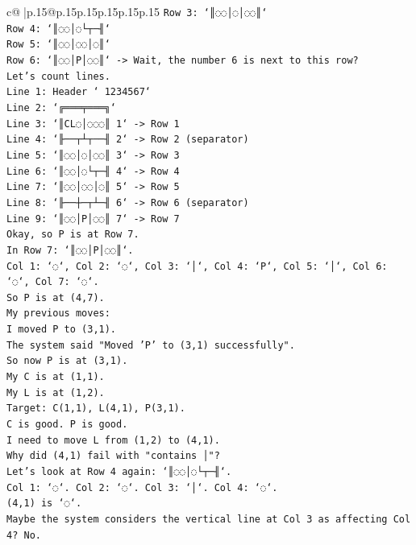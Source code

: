 \documentclass{article}
\begin{document}
{\begin{supertabular}{c@{$\;$}|p{.15\linewidth}@{}p{.15\linewidth}p{.15\linewidth}p{.15\linewidth}p{.15\linewidth}p{.15\linewidth}}
{{{\texttt{Row 3: `║◌◌│◌│◌◌║`} \\
\texttt{Row 4: `║◌◌│◌└┬─╢`} \\
\texttt{Row 5: `║◌◌│◌◌│◌║`} \\
\texttt{Row 6: `║◌◌│P│◌◌║` {-}> Wait, the number 6 is next to this row?} \\
\texttt{Let's count lines.} \\
\texttt{Line 1: Header ` 1234567`} \\
\texttt{Line 2: `╔═══╤═══╗`} \\
\texttt{Line 3: `║CL◌│◌◌◌║ 1` {-}> Row 1} \\
\texttt{Line 4: `╟──┬┴┬──╢ 2` {-}> Row 2 (separator)} \\
\texttt{Line 5: `║◌◌│◌│◌◌║ 3` {-}> Row 3} \\
\texttt{Line 6: `║◌◌│◌└┬─╢ 4` {-}> Row 4} \\
\texttt{Line 7: `║◌◌│◌◌│◌║ 5` {-}> Row 5} \\
\texttt{Line 8: `╟──┼─┬┴─╢ 6` {-}> Row 6 (separator)} \\
\texttt{Line 9: `║◌◌│P│◌◌║ 7` {-}> Row 7} \\
\texttt{Okay, so P is at Row 7.} \\
\texttt{In Row 7: `║◌◌│P│◌◌║`.} \\
\texttt{Col 1: `◌`, Col 2: `◌`, Col 3: `│`, Col 4: `P`, Col 5: `│`, Col 6: `◌`, Col 7: `◌`.} \\
\texttt{So P is at (4,7).} \\
\texttt{My previous moves:} \\
\texttt{I moved P to (3,1).} \\
\texttt{The system said "Moved 'P' to (3,1) successfully".} \\
\texttt{So now P is at (3,1).} \\
\texttt{My C is at (1,1).} \\
\texttt{My L is at (1,2).} \\
\texttt{Target: C(1,1), L(4,1), P(3,1).} \\
\texttt{C is good. P is good.} \\
\texttt{I need to move L from (1,2) to (4,1).} \\
\texttt{Why did (4,1) fail with "contains │"?} \\
\texttt{Let's look at Row 4 again: `║◌◌│◌└┬─╢`.} \\
\texttt{Col 1: `◌`. Col 2: `◌`. Col 3: `│`. Col 4: `◌`.} \\
\texttt{(4,1) is `◌`.} \\
\texttt{Maybe the system considers the vertical line at Col 3 as affecting Col 4? No.} \\
}}}
\end{supertabular}}
\end{document}
